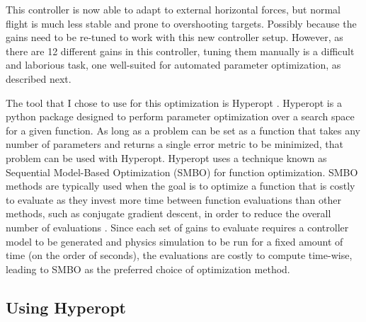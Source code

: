 \documentclass[letterpaper,12pt,titlepage,oneside,final]{book}
\begin{document}
This controller is now able to adapt to external horizontal forces, but normal flight is much less stable and prone to overshooting targets. 
Possibly because the gains need to be re-tuned to work with this new controller setup. 
However, as there are 12 different gains in this controller, tuning them manually is a difficult and laborious task, one well-suited for automated parameter optimization, as described next.

The tool that I chose to use for this optimization is Hyperopt \cite{bergstra2013hyperopt}. 
Hyperopt is a python package designed to perform parameter optimization over a search space for a given function. 
As long as a problem can be set as a function that takes any number of parameters and returns a single error metric to be minimized, that problem can be used with Hyperopt. 
Hyperopt uses a technique known as Sequential Model-Based Optimization (SMBO) for function optimization.
SMBO methods are typically used when the goal is to optimize a function that is costly to evaluate as they invest more time between function evaluations than other methods, such as conjugate gradient descent, in order to reduce the overall number of evaluations \cite{mockus1978application, bergstra2013hyperopt}.
Since each set of gains to evaluate requires a controller model to be generated and physics simulation to be run for a fixed amount of time (on the order of seconds), the evaluations are costly to compute time-wise, leading to SMBO as the preferred choice of optimization method.

\subsection{Using Hyperopt}
\end{document}
